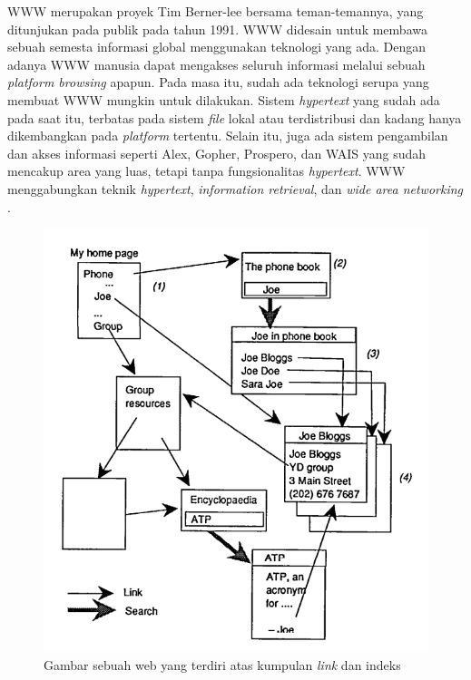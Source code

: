 \documentclass[
	a4paper, %
	12pt, %
	unnumberedsections, %
	twoside, %
]{LTJournalArticle}
\begin{document}
WWW merupakan proyek Tim Berner-lee bersama teman-temannya, yang ditunjukan pada publik pada tahun 1991. WWW didesain untuk membawa sebuah semesta informasi global menggunakan teknologi yang ada. Dengan adanya WWW manusia dapat mengakses seluruh informasi melalui sebuah \textit{platform browsing} apapun. Pada masa itu, sudah ada teknologi serupa yang membuat WWW mungkin untuk dilakukan. Sistem \textit{hypertext} yang sudah ada pada saat itu, terbatas pada sistem \textit{file} lokal atau terdistribusi dan kadang hanya dikembangkan pada \textit{platform} tertentu. Selain itu, juga ada sistem pengambilan dan akses informasi seperti Alex, Gopher, Prospero, dan WAIS yang sudah mencakup area yang luas, tetapi tanpa fungsionalitas \textit{hypertext}. WWW menggabungkan teknik \textit{hypertext}, \textit{information retrieval}, dan \textit{wide area networking} \citep{bernersLee1992}.

\begin{figure}
	\centering
	\includegraphics[width=\linewidth]{gambar/w3_model}
	\caption{Gambar sebuah web yang terdiri atas kumpulan \textit{link} dan indeks \citep{bernersLee1992}}
	\label{gambar:w3_model}
\end{figure}
\end{document}
